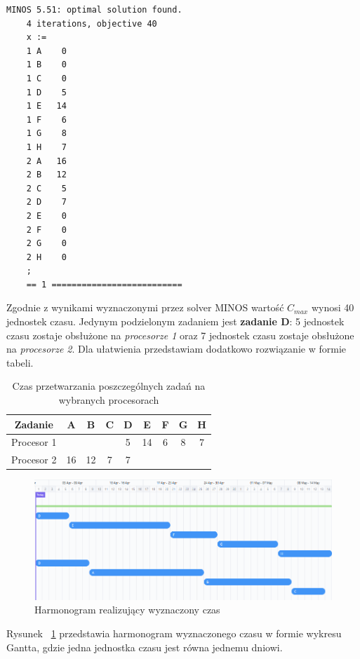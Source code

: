 \documentclass[
    12pt, %
]{../fphw}
\begin{document}
\begin{lstlisting}[caption=Rozwiązanie znalezione solwerem minos]
    MINOS 5.51: optimal solution found.
    4 iterations, objective 40
    x :=
    1 A    0
    1 B    0
    1 C    0
    1 D    5
    1 E   14
    1 F    6
    1 G    8
    1 H    7
    2 A   16
    2 B   12
    2 C    5
    2 D    7
    2 E    0
    2 F    0
    2 G    0
    2 H    0
    ;
    == 1 ==========================
\end{lstlisting}
Zgodnie z wynikami wyznaczonymi przez solver MINOS wartość \(C_{max}\) wynosi 40 jednostek czasu.
Jedynym podzielonym zadaniem jest \textbf{zadanie D}: 5 jednostek czasu zostaje obsłużone na \textit{procesorze 1}
oraz 7 jednostek czasu zostaje obsłużone na \textit{procesorze 2}.
Dla ułatwienia przedstawiam dodatkowo rozwiązanie w formie tabeli.
\begin{table}[H]
    \centering
    \begin{tabular}{| c | c | c | c | c | c | c | c | c |}
        \hline
        Zadanie    & A  & B  & C & D & E  & F & G & H \\
        \hline
        Procesor 1 &    &    &   & 5 & 14 & 6 & 8 & 7 \\
        \hline
        Procesor 2 & 16 & 12 & 7 & 7 &    &   &   &   \\
        \hline
    \end{tabular}
    \caption{Czas przetwarzania poszczególnych zadań na wybranych procesorach}
\end{table}


\begin{figure}[H]
    \centering
    \includegraphics[width=\linewidth]{./img/harmonogram-1.PNG}
    \caption{Harmonogram realizujący wyznaczony czas}
    \label{fig:harmonogram-1}
\end{figure}

Rysunek ~\ref{fig:harmonogram-1} przedstawia harmonogram wyznaczonego czasu
w formie wykresu Gantta, gdzie jedna jednostka czasu jest równa jednemu dniowi.
\end{document}
